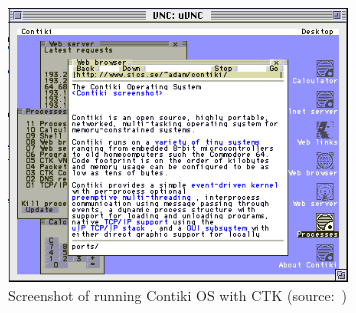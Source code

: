 \begin{figure}
  \centering
  \includegraphics[width=9cm,keepaspectratio]{fig/contiki-vnc.png}
  \caption{Screenshot of running Contiki OS with CTK (source:~\cite{contiki-docs})}
  \label{fig:contiki-ctk}
\end{figure}
